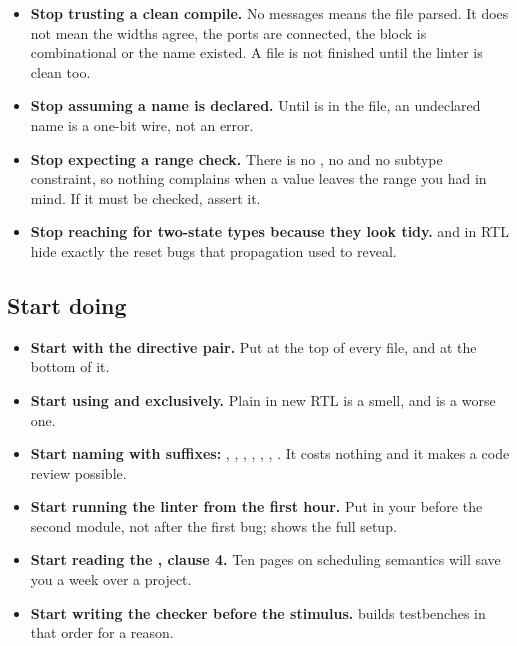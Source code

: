 \begin{itemize}
\item \textbf{Stop trusting a clean compile.} No messages means the file
  parsed. It does not mean the widths agree, the ports are connected, the block
  is combinational or the name existed. A file is not finished until the linter
  is clean too.
\item \textbf{Stop assuming a name is declared.} Until
   is in the file, an undeclared name is a
  one-bit wire, not an error.
\item \textbf{Stop expecting a range check.} There is no , no
   and no subtype constraint, so nothing complains when a
  value leaves the range you had in mind. If it must be checked, assert it.
\item \textbf{Stop reaching for two-state types because they look tidy.}
   and  in RTL hide exactly the reset bugs that 
  propagation used to reveal.
\end{itemize}

\subsection{Start doing}

\begin{itemize}
\item \textbf{Start with the directive pair.} Put
   at the top of every file, and
   at the bottom of it.
\item \textbf{Start using  and 
  exclusively.} Plain  in new RTL is a smell, and
   is a worse one.
\item \textbf{Start naming with suffixes:} , ,
  , , , , . It costs nothing
  and it makes a code review possible.
\item \textbf{Start running the linter from the first hour.} Put
   in your  before the second
  module, not after the first bug;  shows the full setup.
\item \textbf{Start reading the \LRM{}, clause 4.} Ten pages on scheduling
  semantics will save you a week over a project.
\item \textbf{Start writing the checker before the stimulus.}
   builds testbenches in that order for a reason.
\end{itemize}

